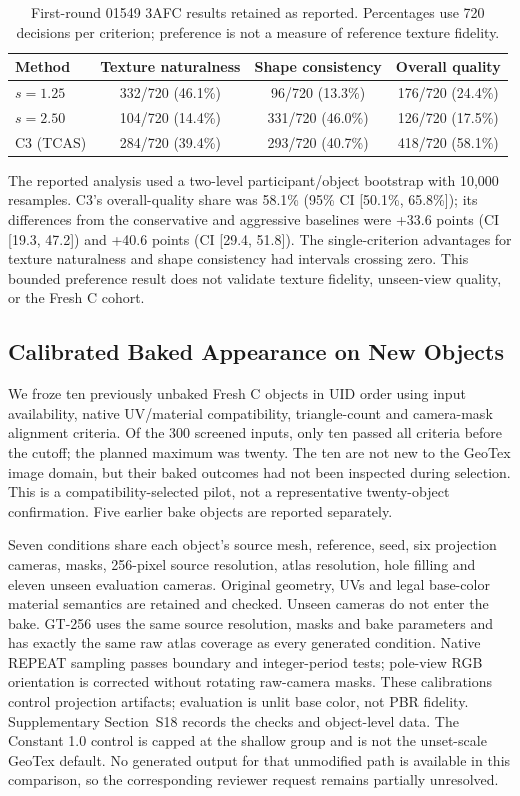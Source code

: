 \documentclass[times,twocolumn,final]{elsarticle}
\begin{document}
\begin{table}[t]
\centering\scriptsize
\caption{First-round 01549 3AFC results retained as reported. Percentages use 720 decisions per criterion; preference is not a measure of reference texture fidelity.}
\label{tab:preference}
\setlength{\tabcolsep}{3pt}
\begin{tabular}{lccc}
\toprule
Method & Texture naturalness & Shape consistency & Overall quality \\
\midrule
$s=1.25$ & 332/720 (46.1\%) & 96/720 (13.3\%) & 176/720 (24.4\%) \\
$s=2.50$ & 104/720 (14.4\%) & 331/720 (46.0\%) & 126/720 (17.5\%) \\
C3 (TCAS) & 284/720 (39.4\%) & 293/720 (40.7\%) & 418/720 (58.1\%) \\
\bottomrule
\end{tabular}
\end{table}

The reported analysis used a two-level participant/object bootstrap with 10,000 resamples. C3's overall-quality share was 58.1\% (95\% CI [50.1\%, 65.8\%]); its differences from the conservative and aggressive baselines were +33.6 points (CI [19.3, 47.2]) and +40.6 points (CI [29.4, 51.8]). The single-criterion advantages for texture naturalness and shape consistency had intervals crossing zero. This bounded preference result does not validate texture fidelity, unseen-view quality, or the Fresh C cohort.

\subsection{Calibrated Baked Appearance on New Objects}
\label{subsec:new-bake}
We froze ten previously unbaked Fresh C objects in UID order using input availability, native UV/material compatibility, triangle-count and camera-mask alignment criteria. Of the 300 screened inputs, only ten passed all criteria before the cutoff; the planned maximum was twenty. The ten are not new to the GeoTex image domain, but their baked outcomes had not been inspected during selection. This is a compatibility-selected pilot, not a representative twenty-object confirmation. Five earlier bake objects are reported separately.

Seven conditions share each object's source mesh, reference, seed, six projection cameras, masks, 256-pixel source resolution, atlas resolution, hole filling and eleven unseen evaluation cameras. Original geometry, UVs and legal base-color material semantics are retained and checked. Unseen cameras do not enter the bake. GT-256 uses the same source resolution, masks and bake parameters and has exactly the same raw atlas coverage as every generated condition. Native REPEAT sampling passes boundary and integer-period tests; pole-view RGB orientation is corrected without rotating raw-camera masks. These calibrations control projection artifacts; evaluation is unlit base color, not PBR fidelity. Supplementary Section~S18 records the checks and object-level data. The Constant 1.0 control is capped at the shallow group and is not the unset-scale GeoTex default. No generated output for that unmodified path is available in this comparison, so the corresponding reviewer request remains partially unresolved.
\end{document}
